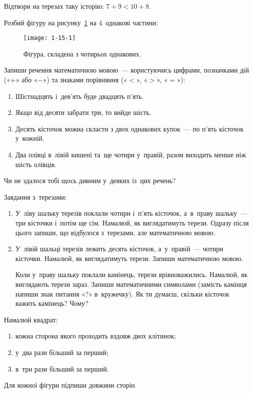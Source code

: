 \problem
Відтвори на терезах таку історію: $7+9 < 10+8$.


\problem
Розбий фігуру на рисунку~\ref{fig:figure-from-four-parts} на 4~однакові частини:

\begin{figure}[ht]
  \centering
  \texttt{[image: 1-15-1]}
  \caption{Фігура, складена з чотирьох однакових.}
  \label{fig:figure-from-four-parts}
\end{figure}


\problem
Запиши речення математичною мовою~--- користуючись цифрами,
позначками дій («$+$» або «$-$») та знаками порівняння («$<$», «$>$», «$=$»):
\begin{enumerate}
  \item Шістнадцять і~дев'ять буде двадцять п'ять.
  \item Якщо від десяти забрати три, то вийде шість.
  \item Десять кісточок можна скласти з двох однакових купок~---
  по п'ять кісточок у~кожній.
  \item Два олівці в~лівій кишені та~ще чотири у~правій,
  разом виходить менше ніж шість олівців.
\end{enumerate}
Чи не здалося тобі щось дивним у~деяких із~цих речень?

\problem
Завдання з~терезами:
\begin{enumerate}
  \item У~ліву шальку терезів поклали чотири і~п'ять кісточок,
  а~в~праву шальку~--- три кісточки і~потім ще сім.
  Намалюй, як виглядатимуть терези.
  Одразу після цього запиши, що відбулося з~терезами,
  але математичною мовою.
  \item У~лівій шальці терезів лежить десять кісточок,
  а~у~правій~--- чотири кісточки.
  Намалюй, як виглядатимуть терези. Запиши математичною мовою.

  Коли у~праву шальку поклали камінець, терези врівноважились.
  Намалюй, як виглядають терези зараз.
  Запиши математичними символами
  (замість камінця напиши знак питання «?» в~кружечку).
  Як ти думаєш, скільки кісточок важить камінець? Чому?
\end{enumerate}


\problem
Намалюй квадрат:
\begin{enumerate}
  \item кожна сторона якого проходить вздовж двох клітинок;
  \item у~два рази більший за перший;
  \item в~три рази більший за перший.
\end{enumerate}
Для кожної фігури підпиши довжини сторін.


